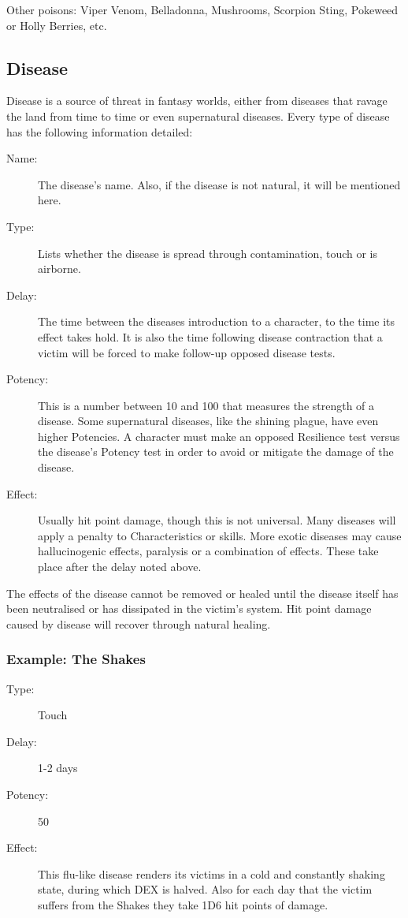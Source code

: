 Other poisons: Viper Venom, Belladonna, Mushrooms, Scorpion Sting, Pokeweed or Holly Berries, etc.

\subsection{Disease}
\label{ssec:disease}
Disease is a source of threat in fantasy worlds, either from diseases that ravage the land from time to time or even supernatural diseases.
Every type of disease has the following information detailed: 

\begin{description}
	\item[Name:] The disease’s name. Also, if the disease is not natural, it will be mentioned here. 
	\item[Type:] Lists whether the disease is spread through contamination, touch or is airborne. 
	\item[Delay:] The time between the diseases introduction to a character, to the time its effect takes hold. It is also the time following disease contraction that a victim will be forced to make follow-up opposed disease tests.
	\item[Potency:] This is a number between 10 and 100 that measures the strength of a disease. Some supernatural diseases, like the shining plague, have even higher Potencies. A character must make an opposed Resilience test versus the disease’s Potency test in order to avoid or mitigate the damage of the disease.
	\item[Effect:] Usually hit point damage, though this is not universal. Many diseases will apply a penalty to Characteristics or skills. More exotic diseases may cause hallucinogenic effects, paralysis or a combination of effects. These take place after the delay noted above. 
\end{description}

The effects of the disease cannot be removed or healed until the disease itself has been neutralised or has dissipated in the victim’s system. Hit point damage caused by disease will recover through natural healing.

\subsubsection{Example: The Shakes}

\begin{description}
\item[Type:] Touch
\item[Delay:] 1-2 days
\item[Potency:] 50
\item[Effect:] This flu-like disease renders its victims in a cold and constantly shaking state, during which DEX is halved. Also for each day that the victim suffers from the Shakes they take 1D6 hit points of damage.
\end{description}

